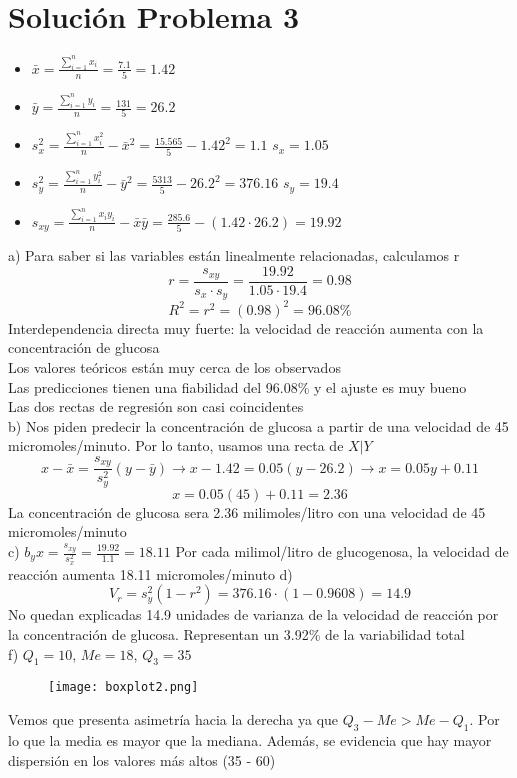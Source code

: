 \documentclass[fleqn]{article}
\begin{document}
	\section{Solución Problema 3}
	\begin{itemize}
		\item $\bar{x} = \frac{\sum_{i=1}^n x_i}{n} = \frac{7.1}{5} = 1.42$
		\item $\bar{y} = \frac{\sum_{i=1}^n y_i}{n} = \frac{131}{5} = 26.2$ 
		\item $s_x^{2} = \frac{\sum_{i=1}^n x_i^{2}}{n} - \bar{x}^{2} = \frac{15.565}{5} - 1.42^{2} = 1.1$ $s_x = 1.05$
		\item $s_y^{2} = \frac{\sum_{i=1}^n y_i^{2}}{n} - \bar{y}^{2} = \frac{5313}{5} - 26.2^{2} = 376.16$ $s_y = 19.4$
		\item $s_{xy} = \frac{\sum_{i=1}^n x_i y_i}{n} - \bar{x} \bar{y} = \frac{285.6}{5} - (1.42 \cdot 26.2) = 19.92$
	\end{itemize}
	a) Para saber si las variables están linealmente relacionadas, calculamos r
	\[
	r = \frac{s_{xy}}{s_x \cdot s_y} = \frac{19.92}{1.05 \cdot 19.4} = \boxed{0.98}
	\]
	\[
	R^2 = r^2 = (0.98)^{2} = \boxed{96.08\%}
	\]
	Interdependencia directa muy fuerte: la velocidad de reacción aumenta con la concentración de glucosa \\
	Los valores teóricos están muy cerca de los observados \\
	Las predicciones tienen una fiabilidad del 96.08\% y el ajuste es muy bueno \\
	Las dos rectas de regresión son casi coincidentes \\
	b) Nos piden predecir la concentración de glucosa a partir de una velocidad de 45 micromoles/minuto. Por lo tanto, usamos una recta de $X | Y$
	\[
	x - \bar{x} = \frac{s_{xy}}{s_y^{2}} (y - \bar{y}) \rightarrow x - 1.42 = 0.05(y - 26.2) \rightarrow x = 0.05y + 0.11
	\]
	\[
	x = 0.05(45) + 0.11 = 2.36
	\]
	La concentración de glucosa sera 2.36 milimoles/litro con una velocidad de 45 micromoles/minuto \\
	c) $b_yx = \frac{s_{xy}}{s_x^2} = \frac{19.92}{1.1} = 18.11$
	Por cada milimol/litro de glucogenosa, la velocidad de reacción aumenta 18.11 micromoles/minuto
	d)
	\[
	V_r = s_y^2 (1-r^2) = 376.16 \cdot (1-0.9608) = \boxed{14.9} 
	\]
	No quedan explicadas 14.9 unidades de varianza de la velocidad de reacción por la concentración de glucosa. Representan un 3.92\% de la variabilidad total \\
	f) $Q_1 = 10$, $Me = 18$, $Q_3 = 35$
	\begin{figure}[H]
		\texttt{[image: boxplot2.png]}
	\end{figure}
	Vemos que presenta asimetría hacia la derecha ya que $Q_3 - Me > Me - Q_1$. Por lo que la media es mayor que la mediana. Además, se evidencia que hay mayor dispersión en los valores más altos (35 - 60)
\end{document}
